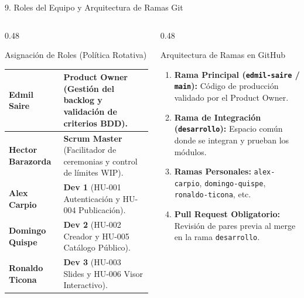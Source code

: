 \documentclass[aspectratio=169, 10pt, spanish]{beamer}
\begin{document}
\begin{frame}{9. Roles del Equipo y Arquitectura de Ramas Git}
\begin{columns}[T]
    \begin{column}{0.48\textwidth}
        \begin{academicbox}{Asignación de Roles (Política Rotativa)}
            \tiny
            \renewcommand{\arraystretch}{1.15}
            \begin{tabularx}{\textwidth}{>{\bfseries}p{2.8cm}X}
                \toprule
                Edmil Saire & \textbf{Product Owner} (Gestión del backlog y validación de criterios BDD). \\
                \midrule
                Hector Barazorda & \textbf{Scrum Master} (Facilitador de ceremonias y control de límites WIP). \\
                \midrule
                Alex Carpio & \textbf{Dev 1} (HU-001 Autenticación y HU-004 Publicación). \\
                \midrule
                Domingo Quispe & \textbf{Dev 2} (HU-002 Creador y HU-005 Catálogo Público). \\
                \midrule
                Ronaldo Ticona & \textbf{Dev 3} (HU-003 Slides y HU-006 Visor Interactivo). \\
                \bottomrule
            \end{tabularx}
        \end{academicbox}
    \end{column}
    \begin{column}{0.48\textwidth}
        \begin{formalbox}{Arquitectura de Ramas en GitHub}
            \scriptsize
            \begin{enumerate}
                \item \textbf{Rama Principal (\texttt{edmil-saire} / \texttt{main}):} Código de producción validado por el Product Owner.
                \item \textbf{Rama de Integración (\texttt{desarrollo}):} Espacio común donde se integran y prueban los módulos.
                \item \textbf{Ramas Personales:} \texttt{alex-carpio}, \texttt{domingo-quispe}, \texttt{ronaldo-ticona}, etc.
                \item \textbf{Pull Request Obligatorio:} Revisión de pares previa al merge en la rama \texttt{desarrollo}.
            \end{enumerate}
        \end{formalbox}
    \end{column}
\end{columns}
\end{frame}
\end{document}
